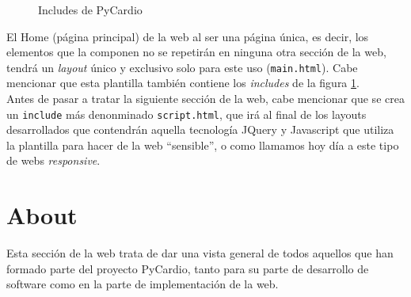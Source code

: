 \begin{figure}[H]
    \centering
    \caption{Includes de PyCardio}
    \label{fig:includ}
\end{figure}

El Home (página principal) de la web al ser una página única, es decir, los elementos que la componen no se repetirán en ninguna otra sección de la web, tendrá un \emph{layout} único y exclusivo solo para este uso (\texttt{main.html}). Cabe mencionar que esta plantilla también contiene los \emph{includes} de la figura \ref{fig:includ}. \\ 
Antes de pasar a tratar la siguiente sección de la web, cabe mencionar que se crea un \texttt{include} más denonminado \texttt{script.html}, que irá al final de los layouts desarrollados que contendrán aquella tecnología JQuery y Javascript que utiliza la plantilla para hacer de la web   ``sensible'', o como llamamos hoy  día a este tipo de webs \textit{responsive}.
\section{About}
\label{sec:aboutWeb}
Esta sección de la web trata de dar una vista general de todos aquellos que han formado parte del proyecto PyCardio, tanto para su parte de desarrollo de software como en la parte de implementación de la web. 

